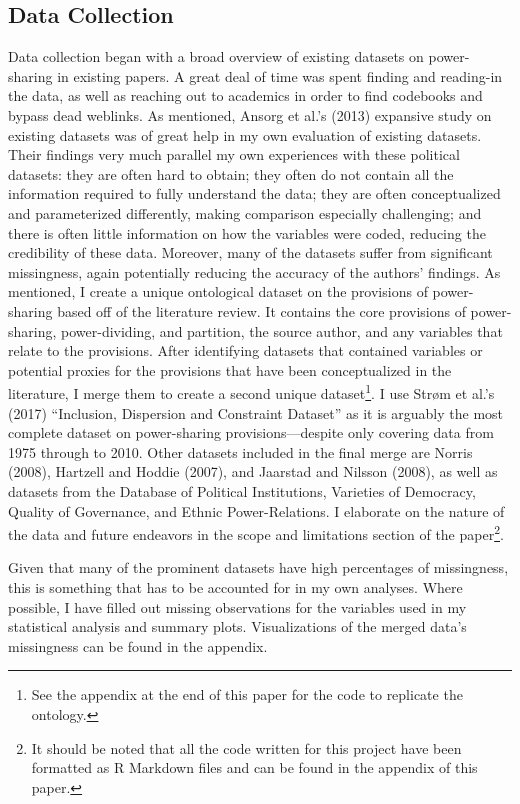 \documentclass[12pt]{article}
\begin{document}
\subsection{Data Collection}
Data collection began with a broad overview of existing datasets on power-sharing in existing papers. A great deal of time was spent finding and reading-in the data, as well as reaching out to academics in order to find codebooks and bypass dead weblinks. As mentioned, Ansorg et al.’s (2013) expansive study on existing datasets was of great help in my own evaluation of existing datasets. Their findings very much parallel my own experiences with these political datasets: they are often hard to obtain; they often do not contain all the information required to fully understand the data; they are often conceptualized and parameterized differently, making comparison especially challenging; and there is often little information on how the variables were coded, reducing the credibility of these data. Moreover, many of the datasets suffer from significant missingness, again potentially reducing the accuracy of the authors’ findings. As mentioned, I create a unique ontological dataset on the provisions of power-sharing based off of the literature review. It contains the core provisions of power-sharing, power-dividing, and partition, the source author, and any variables that relate to the provisions. After identifying datasets that contained variables or potential proxies for the provisions that have been conceptualized in the literature, I merge them to create a second unique dataset\footnote{See the appendix at the end of this paper for the code to replicate the ontology.}. I use Strøm et al.’s (2017) ``Inclusion, Dispersion and Constraint Dataset'' as it is arguably the most complete dataset on power-sharing provisions---despite only covering data from 1975 through to 2010. Other datasets included in the final merge are Norris (2008), Hartzell and Hoddie (2007), and Jaarstad and Nilsson (2008), as well as datasets from the Database of Political Institutions, Varieties of Democracy, Quality of Governance, and Ethnic Power-Relations. I elaborate on the nature of the data and future endeavors in the scope and limitations section of the paper\footnote{It should be noted that all the code written for this project have been formatted as R Markdown files and can be found in the appendix of this paper.}.  

Given that many of the prominent datasets have high percentages of missingness, this is something that has to be accounted for in my own analyses. Where possible, I have filled out missing observations for the variables used in my statistical analysis and summary plots. Visualizations of the merged data’s missingness can be found in the appendix. 
\end{document}
